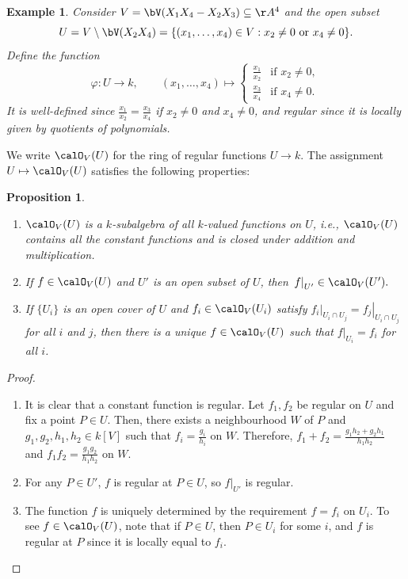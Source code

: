 \documentclass[12pt]{amsart}
\theoremstyle{plain}
\newtheorem{proposition}[theorem]{Proposition}
\newtheorem{example}[theorem]{Example}
\begin{document}
\begin{example}
Consider $V = \bV(X_1 X_4 - X_2 X_3) \subseteq \AA^4$ and the open subset
$$U = V \setminus \bV(X_2 X_4) = \{(x_1, \ldots, x_4) \in V : x_2 \ne 0 \text{ or } x_4 \ne 0\}.$$
Define the function
$$\varphi : U \to k, \qquad
(x_1, \ldots, x_4) \mapsto 
\begin{cases} 
	\frac{x_1}{x_2} & \text{if } x_2 \ne 0, \\ 
	\frac{x_3}{x_4} & \text{if } x_4 \ne 0. 
\end{cases}$$
It is well-defined since $\frac{x_1}{x_2} = \frac{x_3}{x_4}$ if $x_2 \ne 0$ and $x_4 \ne 0$, and regular since it is locally given by quotients of polynomials.
\end{example}

We write $\calO_V(U)$ for the ring of regular functions $U \to k$.
The assignment $U \mapsto \calO_V(U)$ satisfies the following properties:

\begin{proposition}\label{sheafprop}
\begin{enumerate}
\item
$\calO_V(U)$ is a $k$-subalgebra of all $k$-valued functions on $U$, i.e., $\calO_V(U)$ contains all the constant functions and is closed under addition and multiplication.

\item
If $f \in \calO_V(U)$ and $U'$ is an open subset of $U$, then $\left. f \right|_{U'} \in \calO_V(U').$

\item
If $\{U_i\}$ is an open cover of $U$ and $f_i \in \calO_V(U_i)$ satisfy $\left. f_i \right|_{U_i \cap U_j} = \left. f_j \right|_{U_i \cap U_j}$ for all $i$ and $j$, then there is a unique $f \in \calO_V(U)$ such that $\left. f \right|_{U_i} = f_i$ for all $i$.
\end{enumerate}
\end{proposition}
\begin{proof}
\begin{enumerate}
\item
It is clear that a constant function is regular.
Let $f_1, f_2$ be regular on $U$ and fix a point $P \in U$.
Then, there exists a neighbourhood $W$ of $P$ and $g_1, g_2, h_1, h_2 \in k[V]$ such that $f_i = \frac{g_i}{h_i}$ on $W$.
Therefore, $f_1 + f_2 = \frac{g_1 h_2 + g_2 h_1}{h_1 h_2}$ and $f_1 f_2 = \frac{g_1 g_2}{h_1 h_2}$ on $W$.

\item
For any $P \in U'$, $f$ is regular at $P \in U$, so $\left. f \right|_{U'}$ is regular.

\item
The function $f$ is uniquely determined by the requirement $f = f_i$ on $U_i$.
To see $f \in \calO_V(U)$, note that if $P \in U$, then $P\in U_i$ for some $i$, and $f$ is regular at $P$ since it is locally equal to $f_i$.
\end{enumerate}
\end{proof}
\end{document}
